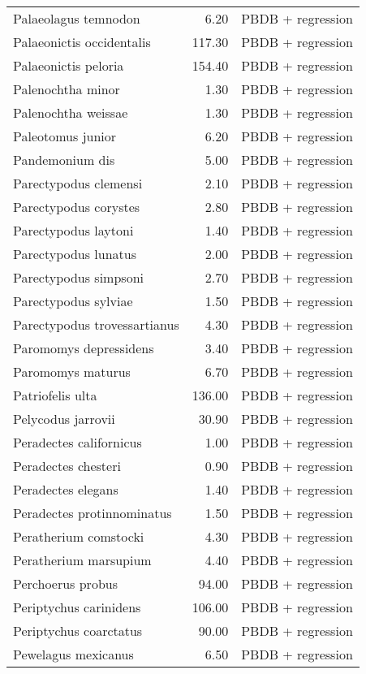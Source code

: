 \begin{table}[ht]
\begin{tabular}{lrl}
  Palaeolagus temnodon & 6.20 & PBDB + regression \\ 
  Palaeonictis occidentalis & 117.30 & PBDB + regression \\ 
  Palaeonictis peloria & 154.40 & PBDB + regression \\ 
  Palenochtha minor & 1.30 & PBDB + regression \\ 
  Palenochtha weissae & 1.30 & PBDB + regression \\ 
  Paleotomus junior & 6.20 & PBDB + regression \\ 
  Pandemonium dis & 5.00 & PBDB + regression \\ 
  Parectypodus clemensi & 2.10 & PBDB + regression \\ 
  Parectypodus corystes & 2.80 & PBDB + regression \\ 
  Parectypodus laytoni & 1.40 & PBDB + regression \\ 
  Parectypodus lunatus & 2.00 & PBDB + regression \\ 
  Parectypodus simpsoni & 2.70 & PBDB + regression \\ 
  Parectypodus sylviae & 1.50 & PBDB + regression \\ 
  Parectypodus trovessartianus & 4.30 & PBDB + regression \\ 
  Paromomys depressidens & 3.40 & PBDB + regression \\ 
  Paromomys maturus & 6.70 & PBDB + regression \\ 
  Patriofelis ulta & 136.00 & PBDB + regression \\ 
  Pelycodus jarrovii & 30.90 & PBDB + regression \\ 
  Peradectes californicus & 1.00 & PBDB + regression \\ 
  Peradectes chesteri & 0.90 & PBDB + regression \\ 
  Peradectes elegans & 1.40 & PBDB + regression \\ 
  Peradectes protinnominatus & 1.50 & PBDB + regression \\ 
  Peratherium comstocki & 4.30 & PBDB + regression \\ 
  Peratherium marsupium & 4.40 & PBDB + regression \\ 
  Perchoerus probus & 94.00 & PBDB + regression \\ 
  Periptychus carinidens & 106.00 & PBDB + regression \\ 
  Periptychus coarctatus & 90.00 & PBDB + regression \\ 
  Pewelagus mexicanus & 6.50 & PBDB + regression \\ 

\end{tabular}
\end{table}
